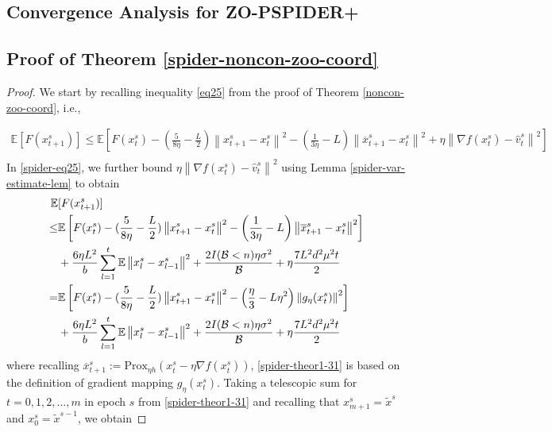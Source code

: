 \documentclass[iicol,sn-basic]{sn-jnl}
\theoremstyle{thmstyleone}%
\theoremstyle{thmstyletwo}%
\theoremstyle{thmstylethree}%
\newcommand*{\Po}{\text{Prox}}
\newcommand*{\E}{\mathbb{E}}
\newcommand{\norm}[1]{\left\lVert#1\right\rVert}
\begin{document}
\subsection{Convergence Analysis for ZO-PSPIDER+}

\noindent\subsection{Proof of Theorem \ref{spider-noncon-zoo-coord}}
\begin{proof}
We start by recalling inequality \eqref{eq25} from the proof of Theorem \ref{noncon-zoo-coord}, i.e.,

 \begin{equation}\label{spider-eq25}
 \begin{split} 
\E[F({x}_{t+1}^s)] \leq \E\left[F({x}_{t}^s)  -(\frac{5}{8\eta} - \frac{L}{2})\norm{{x}_{t+1}^s-x_{t}^s}^2- \left(\frac{1}{3\eta}-L\right)\norm{\overline{x}_{t+1}^s-x_{t}^s}^2+\eta \norm{\nabla f(x_{t}^s)-\hat{v}_{t}^s}^2\right]\\
 \end{split}
 \end{equation}
In \eqref{spider-eq25}, we further bound $\eta \norm{\nabla f(x_{t}^s)-\hat{v}_{t}^s}^2$ using Lemma \ref{spider-var-estimate-lem} to obtain
 \begin{align} 
\E&[F({x}_{t+1}^s)] \notag
\notag
\\ \leq& \E\left[F({x}_{t}^s)  -(\frac{5}{8\eta} - \frac{L}{2})\norm{{x}_{t+1}^s-x_{t}^s}^2- \left(\frac{1}{3\eta}-L\right)\norm{\overline{x}_{t+1}^s-x_{t}^s}^2\right]\notag\\
&+ \frac{6\eta L^2}{b}\sum_{l=1}^t\E\norm{x_{l}^s-{x}_{l-1}^{s}}^2 + \frac{2I(\mathcal{B} < n)\eta \sigma ^2}{\mathcal{B}}+\eta \frac{7 L^2 d^2 \mu^2 t}{2}\notag
\\ =& \E\left[F({x}_{t}^s)  -(\frac{5}{8\eta} - \frac{L}{2})\norm{{x}_{t+1}^s-x_{t}^s}^2- \left(\frac{\eta}{3}-L\eta^2\right)\norm{g_{\eta}(x_{t}^s)}^2\right]\notag
\\&+\frac{6\eta L^2}{b}\sum_{l=1}^t\E\norm{x_{l}^s-{x}_{l-1}^{s}}^2 + \frac{2I(\mathcal{B} < n)\eta \sigma ^2}{\mathcal{B}}+\eta \frac{7L^2 d^2 \mu^2 t}{2}\label{spider-theor1-31}
 \end{align}
where recalling $\overline{x}_{t+1}^s := \Po_{\eta h}(x_{t}^s - \eta \nabla f(x_{t}^s))$, \eqref{spider-theor1-31} is based on the definition of gradient mapping $g_{\eta}(x_{t}^s)$. Taking a telescopic sum for $t = 0, 1, 2, \ldots, m$ in epoch $s$ from \eqref{spider-theor1-31} and recalling that $x_{m+1}^s = \tilde{x}^s$ and $x_0^s = \tilde{x}^{s-1}$, we obtain

\end{proof}
\end{document}
